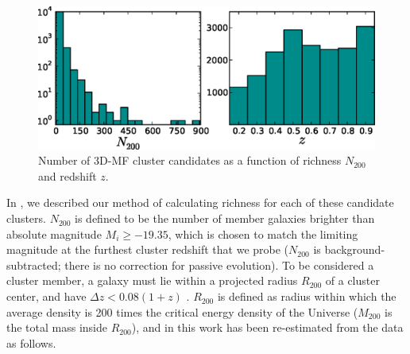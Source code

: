 \begin{figure}
\begin{center}
\vspace{0.5cm}
  \includegraphics[scale=0.9]{plots_ch4/hists_N200_z_NoGaps.eps}
  \caption[Richness and Redshift Distributions of \ac{3D-MF} Clusters]{Number of \ac{3D-MF} cluster candidates as a function of richness $N_{200}$ and redshift $z$.}
\label{plot:hists4}
\end{center}
\end{figure}

In \citet{Ford14}, we described our method of calculating richness for each of these candidate clusters. $N_{200}$ is defined to be the number of member galaxies brighter than absolute magnitude $M_i \ge -19.35$, which is chosen to match the limiting magnitude at the furthest cluster redshift that we probe ($N_{200}$ is background-subtracted; there is no correction for passive evolution). To be considered a cluster member, a galaxy must lie within a projected radius $R_{200}$ of a cluster center, and have $\Delta z < 0.08(1+z)$ \citep[based on the photometric errors of the \ac{CFHTLenS} catalog; for details regarding $N_{200}$ see][]{Ford14}. $R_{200}$ is defined as radius within which the average density is 200 times the critical energy density of the Universe ($M_{200}$ is the total mass inside $R_{200}$), and in this work has been re-estimated from the data as follows. 

